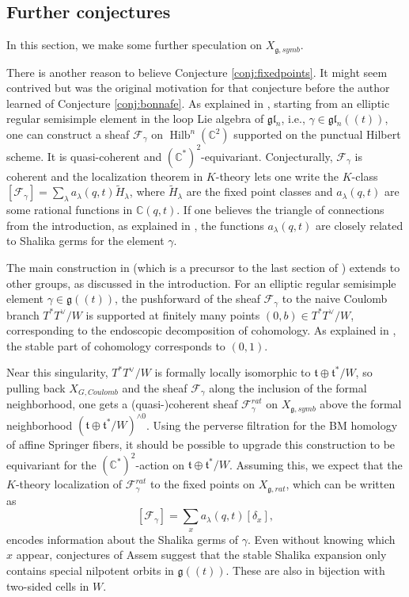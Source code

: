 \documentclass{amsart}
\numberwithin{equation}{section}
\theoremstyle{definition}
\def\tilde{\widetilde}
\DeclareMathOperator{\Hilb}{Hilb}
\newcommand{\cF}{\mathcal{F}}
\newcommand{\fl}{\mathfrak{l}}
\newcommand{\fg}{\mathfrak{g}}
\newcommand{\ft}{\mathfrak{t}}
\newcommand{\C}{{\mathbb C}}
\begin{document}
\subsection{Further conjectures}
In this section, we make some further speculation on $X_{\fg,symb}$.

There is another reason to believe Conjecture \ref{conj:fixedpoints}. It might seem contrived but was the original motivation for that conjecture before the author learned of Conjecture \ref{conj:bonnafe}. As explained in \cite{KT}, starting from an elliptic regular semisimple element in the loop Lie algebra of $\fg\fl_n$, i.e., $\gamma\in \fg\fl_n((t))$, one can construct a sheaf $\cF_\gamma$ on $\Hilb^n(\C^2)$ supported on the punctual Hilbert scheme. It is quasi-coherent and $(\C^*)^2$-equivariant. Conjecturally, $\cF_\gamma$ is coherent and the localization theorem in $K$-theory lets one write the $K$-class $[\cF_\gamma]=\sum_\lambda a_\lambda(q,t) \tilde{H}_\lambda$, where $\tilde{H}_\lambda$ are the fixed point classes and $a_\lambda(q,t)$ are some rational functions in $\C(q,t)$. If one believes the triangle of connections from the introduction, as explained in \cite{KT}, the functions $a_{\lambda}(q,t)$ are closely related to Shalika germs for the element $\gamma$.

The main construction in \cite{GKO} (which is a precursor to the last section of \cite{KT}) extends to other groups, as discussed in the introduction. For an elliptic regular semisimple element $\gamma\in \fg((t))$, the pushforward of the sheaf $\cF_\gamma$ to the naive Coulomb branch $T^*T^\vee/W$ is supported at finitely many points $(0,b)\in T^*T^\vee/W$, corresponding to the endoscopic decomposition of cohomology. As explained in \cite[Theorem 2.16.]{GKO}, the stable part of cohomology corresponds to $(0,1)$. 

Near this singularity, $T^*T^\vee/W$ is formally locally isomorphic to $\ft\oplus \ft^*/W$, so pulling back $X_{G,Coulomb}$ and the sheaf $\cF_\gamma$ along the inclusion of the formal neighborhood, one gets a (quasi-)coherent sheaf $\cF_\gamma^{rat}$ on $X_{\fg,symb}$ above the formal neighborhood $(\ft\oplus \ft^*/W)^{\wedge 0}$. Using the perverse filtration for the BM homology of affine Springer fibers, it should be possible to upgrade this construction to be equivariant for the $(\C^*)^2$-action on $\ft\oplus \ft^*/W$. Assuming this, we expect that the $K$-theory localization of $\cF_\gamma^{rat}$ to the fixed points on $X_{\fg,rat}$, which can be written as $$[\cF_\gamma]=\sum_x a_\lambda(q,t) [\delta_x],$$ encodes information about the Shalika germs of $\gamma$. Even without knowing which $x$ appear, conjectures of Assem \cite{Assem} suggest that the stable Shalika expansion only contains special nilpotent orbits in $\fg((t))$. These are also in bijection with two-sided cells in $W$.
\end{document}
